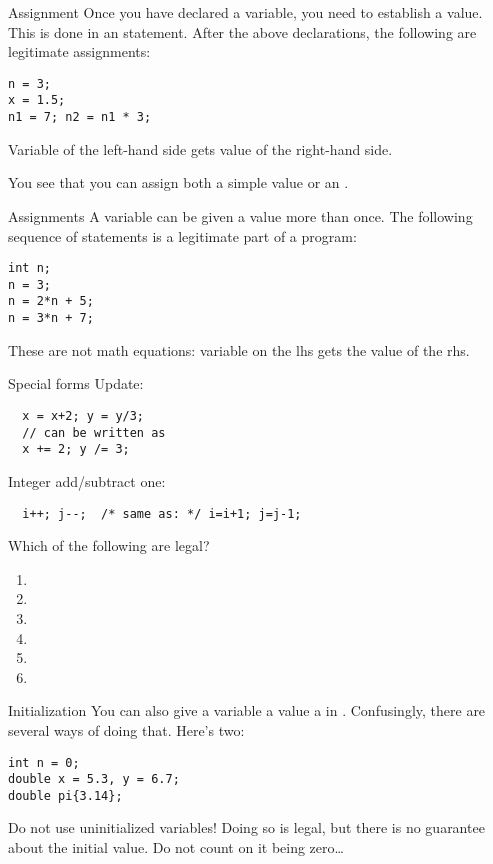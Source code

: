 \begin{block}{Assignment}
  \label{sl:assign1}
  Once you have declared a variable, you need to establish a value. This is done in an
   statement. After the above declarations, the
  following are legitimate assignments:
\begin{verbatim}
n = 3;
x = 1.5;
n1 = 7; n2 = n1 * 3;
\end{verbatim}
Variable of the left-hand side gets value of the right-hand side.

You see that you can assign both a simple value or an
.
\end{block}

\begin{block}{Assignments}
  \label{sl:assign2}
  A variable can be given a value more than once. The following
  sequence of statements is a legitimate part of a program:
\begin{verbatim}
int n;
n = 3;
n = 2*n + 5;
n = 3*n + 7;
\end{verbatim}
These are not math equations: variable on the lhs gets the value of
the rhs.
\end{block}

\begin{block}{Special forms}
  \label{sl:special-assign}
  Update:
\begin{verbatim}
  x = x+2; y = y/3;
  // can be written as
  x += 2; y /= 3;
\end{verbatim}
Integer add/subtract one:
\begin{verbatim}
  i++; j--;  /* same as: */ i=i+1; j=j-1;
\end{verbatim}
\end{block}

\begin{exercise}
  \label{q:assign}
  Which of the following are legal?
  \begin{enumerate}
  \item {}
  \item {}
  \item {}
  \item {}
  \item {}
  \item {}
  \end{enumerate}
\end{exercise}

\begin{block}{Initialization}
  \label{sl:init-var}
  You can also give a variable a value a in
  . Confusingly, there are
  several ways of doing that. Here's two:
\begin{verbatim}
int n = 0;
double x = 5.3, y = 6.7;
double pi{3.14};
\end{verbatim}
  Do not use uninitialized variables! Doing so is legal, but there is
  no guarantee about the initial value. Do not count on it being zero\ldots
\end{block}

